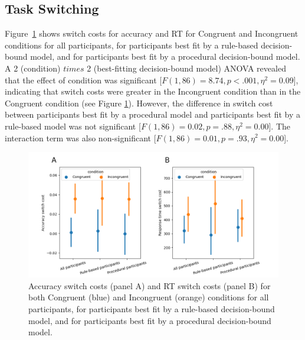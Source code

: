 \documentclass[doc, floatsintext]{apa7}
\begin{document}
\subsection{Task Switching}
Figure~\ref{fig_switch_cost} shows switch costs for accuracy and RT for Congruent and Incongruent conditions for all participants, for participants best fit by a rule-based decision-bound model, and for participants best fit by a procedural decision-bound model. A 2 (condition) $times$ 2 (best-fitting decision-bound model) ANOVA revealed that the effect of
condition was significant [$F(1, 86) = 8.74, p < .001, \eta^2 = 0.09$], indicating that switch costs were greater
in the Incongruent condition than in the Congruent condition (see Figure \ref{fig_switch_cost}). However, the difference in switch cost between participants best fit by a procedural
model and participants best fit by a rule-based model was not significant [$F(1, 86) = 0.02, p = .88, \eta^2 = 0.00$]. The interaction term was also non-significant [$F(1, 86) = 0.01, p = .93, \eta^2 = 0.00$]. 

\begin{figure}[h!]
    \centering
    \includegraphics[width=1\textwidth]{../figures/fig_switch_cost.png}
    \caption{
        Accuracy switch costs (panel A) and RT switch costs (panel B) for both Congruent (blue) and Incongruent       (orange) conditions for all participants, for participants best fit by a rule-based decision-bound model, and for participants best fit by a procedural decision-bound model.
    }
    \label{fig_switch_cost}
\end{figure}
\end{document}
